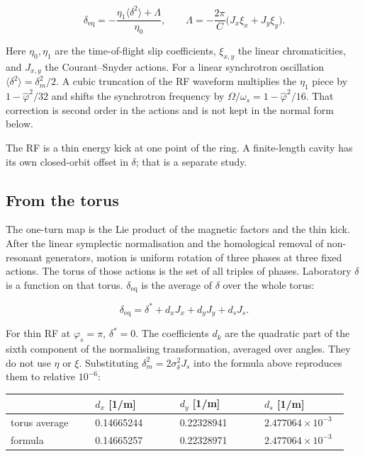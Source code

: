 \documentclass[11pt,a4paper]{article}
\begin{document}
\[
\delta_{\mathrm{eq}}
=-\frac{\eta_1\langle\delta^2\rangle+\Lambda}{\eta_0},\qquad
\Lambda=-\frac{2\pi}{C}\bigl(J_x\xi_x+J_y\xi_y\bigr).
\]

Here $\eta_0,\eta_1$ are the time-of-flight slip coefficients,
$\xi_{x,y}$ the linear chromaticities, and $J_{x,y}$ the Courant–Snyder
actions. For a linear synchrotron oscillation $\langle\delta^2\rangle=\delta_m^2/2$.
A cubic truncation of the RF waveform multiplies the $\eta_1$ piece by
$1-\hat\varphi^2/32$ and shifts the synchrotron frequency by
$\Omega/\omega_s=1-\hat\varphi^2/16$. That correction is second order in
the actions and is not kept in the normal form below.

The RF is a thin energy kick at one point of the ring. A finite-length
cavity has its own closed-orbit offset in $\delta$; that is a separate
study.

\subsection{From the torus}

The one-turn map is the Lie product of the magnetic factors and the thin
kick. After the linear symplectic normalisation and the homological
removal of non-resonant generators, motion is uniform rotation of three
phases at three fixed actions. The torus of those actions is the set of
all triples of phases. Laboratory $\delta$ is a function on that torus.
$\delta_{\mathrm{eq}}$ is the average of $\delta$ over the whole torus:

\[
\delta_{\mathrm{eq}}=\delta^\ast+d_x J_x+d_y J_y+d_s J_s.
\]

For thin RF at $\varphi_s=\pi$, $\delta^\ast=0$. The coefficients $d_k$
are the quadratic part of the sixth component of the normalising
transformation, averaged over angles. They do not use $\eta$ or
$\xi$. Substituting $\delta_m^2=2\sigma_\delta^2 J_s$ into the formula
above reproduces them to relative $10^{-6}$:

\begin{center}\small\begin{tabular}{p{0.238\linewidth}p{0.238\linewidth}p{0.238\linewidth}p{0.238\linewidth}}\hline
\textbf{} & \textbf{$d_x$ [1/m]} & \textbf{$d_y$ [1/m]} & \textbf{$d_s$ [1/m]}\\\hline
torus average & 0.14665244 & 0.22328941 & $2.477064\times 10^{-3}$\\
formula & 0.14665257 & 0.22328971 & $2.477064\times 10^{-3}$\\
\hline\end{tabular}\end{center}
\end{document}
